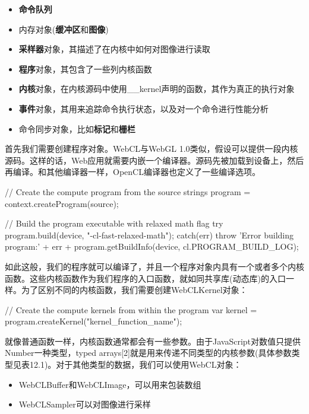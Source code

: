 \begin{itemize}
\item \textbf{命令队列}
\item 内存对象(\textbf{缓冲区}和\textbf{图像})
\item \textbf{采样器}对象，其描述了在内核中如何对图像进行读取
\item \textbf{程序}对象，其包含了一些列内核函数
\item \textbf{内核}对象，在内核源码中使用\_\allowbreak{}\_\allowbreak{}kernel声明的函数，其作为真正的执行对象
\item \textbf{事件}对象，其用来追踪命令执行状态，以及对一个命令进行性能分析
\item 命令同步对象，比如\textbf{标记}和\textbf{栅栏}
\end{itemize}

首先我们需要创建程序对象。WebCL与WebGL 1.0类似，假设可以提供一段内核源码。这样的话，Web应用就需要内嵌一个编译器。源码先被加载到设备上，然后再编译。和其他编译器一样，OpenCL编译器也定义了一些编译选项。

\begin{codebox}[javascript]
// Create the compute program from the source strings
program = context.createProgram(source);

// Build the program executable with relaxed math flag
try{
  program.build(device, "-cl-fast-relaxed-math");
} catch(err) {
  throw 'Error building program:' + err + program.getBuildInfo(device, cl.PROGRAM_BUILD_LOG);
}
\end{codebox}

如此这般，我们的程序就可以编译了，并且一个程序对象内具有一个或者多个内核函数。这些内核函数作为我们程序的入口函数，就如同共享库(动态库)的入口一样。为了区别不同的内核函数，我们需要创建WebCLKernel对象：

\begin{codebox}[javascript]
// Create the compute kernels from within the program
var kernel = program.createKernel("kernel_function_name");
\end{codebox}

就像普通函数一样，内核函数通常都会有一些参数。由于JavaScript对数值只提供Number一种类型，typed arrays[2]就是用来传递不同类型的内核参数(具体参数类型见表12.1)。对于其他类型的数据，我们可以使用WebCL对象：

\begin{itemize}
\item WebCLBuffer和WebCLImage，可以用来包装数组
\item WebCLSampler可以对图像进行采样
\end{itemize}

